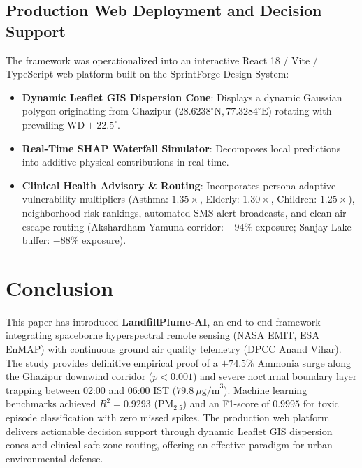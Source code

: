 \documentclass[conference]{IEEEtran}
\begin{document}
\subsection{Production Web Deployment and Decision Support}
The framework was operationalized into an interactive React 18 / Vite / TypeScript web platform built on the SprintForge Design System:
\begin{itemize}
    \item \textbf{Dynamic Leaflet GIS Dispersion Cone}: Displays a dynamic Gaussian polygon originating from Ghazipur ($28.6238^\circ\text{N}, 77.3284^\circ\text{E}$) rotating with prevailing $\text{WD} \pm 22.5^\circ$.
    \item \textbf{Real-Time SHAP Waterfall Simulator}: Decomposes local predictions into additive physical contributions in real time.
    \item \textbf{Clinical Health Advisory \& Routing}: Incorporates persona-adaptive vulnerability multipliers (Asthma: $1.35\times$, Elderly: $1.30\times$, Children: $1.25\times$), neighborhood risk rankings, automated SMS alert broadcasts, and clean-air escape routing (Akshardham Yamuna corridor: $-94\%$ exposure; Sanjay Lake buffer: $-88\%$ exposure).
\end{itemize}

\section{Conclusion}
This paper has introduced \textbf{LandfillPlume-AI}, an end-to-end framework integrating spaceborne hyperspectral remote sensing (NASA EMIT, ESA EnMAP) with continuous ground air quality telemetry (DPCC Anand Vihar). The study provides definitive empirical proof of a $+74.5\%$ Ammonia surge along the Ghazipur downwind corridor ($p < 0.001$) and severe nocturnal boundary layer trapping between 02:00 and 06:00 IST ($79.8\ \mu\text{g/m}^3$). Machine learning benchmarks achieved $R^2 = 0.9293$ ($\text{PM}_{2.5}$) and an F1-score of $0.9995$ for toxic episode classification with zero missed spikes. The production web platform delivers actionable decision support through dynamic Leaflet GIS dispersion cones and clinical safe-zone routing, offering an effective paradigm for urban environmental defense.
\end{document}
